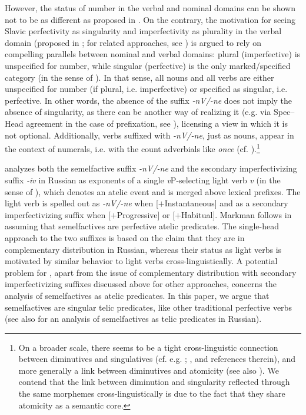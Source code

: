 \documentclass[output=paper,colorlinks,citecolor=brown]{langscibook}
\begin{document}
However, the status of number in the verbal and nominal domains can be shown not to be as different as proposed in \citet{Armoskaite2008}. On the contrary, the motivation for seeing Slavic perfectivity as singularity and imperfectivity as plurality in the verbal domain (proposed in \citealt{Kagan2008,Kagan2010}; for related approaches, see \citealt{Arsenijevic2023, sta+:Milosavljevic2022, Milosavljevic2023Advances, Milosavljevic2023PhD}) is argued to rely on compelling parallels between nominal and verbal domains: plural (imperfective) is unspecified for number, while singular (perfective) is the only marked/specified category (in the sense of \citealt{Sauerland2003}). In that sense, all nouns and all verbs are either unspecified for number (if plural, i.e. imperfective) or specified as singular, i.e. perfective. In other words, the absence of the suffix \textit{-nV/-ne} does not imply the absence of singularity, as there can be another way of realizing it (e.g. via Spec--Head agreement in the case of prefixation, see \citealt{Milosavljevic2023Advances, Milosavljevic2023PhD}), licensing a view in which it is not optional. Additionally, verbs suffixed with \textit{-nV/-ne}, just as nouns, appear in the context of numerals, i.e. with the count adverbials like \textit{once} (cf. \citealt{sta+:Progovac2005}).\footnote{On a broader scale, there seems to be a tight cross-linguistic connection between diminutives and singulatives (cf. e.g. \citealt{Rijkhoff1991}; \citealt[$§4$]{Mathieu2012}, and references therein), and more generally a link between diminutives and atomicity (see also \citealt{Wiltschko2006, DeBelder2008, DeBelder2011, Ott2011}). We contend that the link between diminution and singularity reflected through the same morphemes cross-linguistically is due to the fact that they share atomicity as a semantic core.} 

\citet{Markman2008} analyzes both the semelfactive suffix \textit{-nV/-ne} and the secondary imperfectivizing suffix \textit{-iv} in Russian as exponents of a single \textit{v}P-selecting light verb \textit{v} (in the sense of \citealt{Diesing1998}), which denotes an atelic event and is merged above lexical prefixes. The light verb is spelled out as \mbox{\textit{-nV/-ne}} when [$+$Instantaneous] and as a secondary imperfectivizing suffix when [$+$Progressive] or [$+$Habitual]. Markman follows \citet{Smith1997} in assuming that semelfactives are perfective atelic predicates. The single-head approach to the two suffixes is based on the claim that they are in complementary distribution in Russian, whereas their status as light verbs is motivated by similar behavior to light verbs cross-linguistically. A potential problem for \citet{Markman2008}, apart from the issue of complementary distribution with secondary imperfectivizing suffixes discussed above for other approaches, concerns the analysis of semelfactives as atelic predicates. In this paper, we argue that semelfactives are singular telic predicates, like other traditional perfective verbs (see also \citealt{Rothstein2008Telicity, Rothstein2008Puzzles} for an analysis of semelfactives as telic predicates in Russian).
\end{document}
